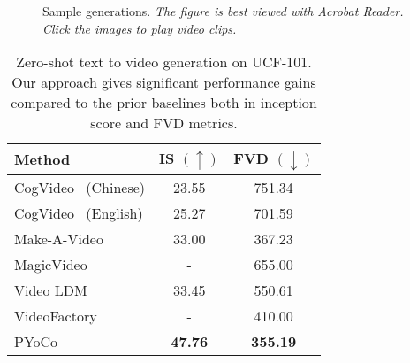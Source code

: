 \documentclass[10pt,twocolumn,letterpaper]{article}
\newcommand{\tabcspace}{\vspace{-2mm}}
\begin{document}
\begin{figure*}[ht!]
    \caption{Sample generations. \textit{The figure is best viewed with Acrobat Reader. Click the images to play video clips.}}
    \vspace{-0.2cm}
    \label{fig:visual_generations}
\end{figure*} 




\setlength{\tabcolsep}{4pt}
\renewcommand{\arraystretch}{1}

\begin{table}[t!]
\centering
\caption{Zero-shot text to video generation on UCF-101. Our approach gives significant performance gains compared to the prior baselines both in inception score and FVD metrics.}
\label{tab:ucf_zeroshot}
\tabcspace
\begin{tabular}{lcc}
\toprule
Method              & IS  $(\uparrow)$   & FVD  $(\downarrow)$   \\
\midrule
CogVideo~\cite{hong2022cogvideo} (Chinese) & 23.55 & 751.34 \\
CogVideo~\cite{hong2022cogvideo} (English) & 25.27 & 701.59 \\
Make-A-Video~\cite{singer2022make}         & 33.00 & 367.23 \\
MagicVideo~\cite{zhou2022magicvideo}   & - & 655.00 \\
Video LDM~\cite{blattmann2023videoldm}   & 33.45 & 550.61 \\
VideoFactory~\cite{wang2023videofactory}  & - & 410.00 \\
\rowcolor[HTML]{DFDFDF} 
PYoCo       & \textbf{47.76} &  \textbf{355.19} \\
\bottomrule
\end{tabular}
\end{table}
\end{document}
